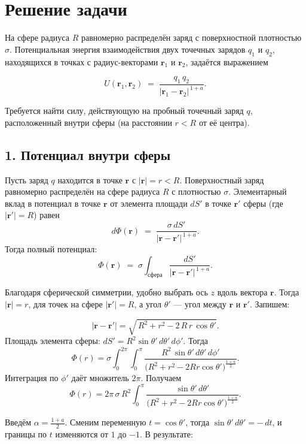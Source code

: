 \documentclass{article}
\begin{document}
\section*{Решение задачи}

На сфере радиуса $R$ равномерно распределён заряд с поверхностной плотностью $\sigma$. Потенциальная энергия взаимодействия двух точечных зарядов $q_1$ и $q_2$, находящихся в точках с радиус-векторами $\mathbf{r}_1$ и $\mathbf{r}_2$, задаётся выражением

\[
U(\mathbf{r}_1,\mathbf{r}_2) \;=\; \frac{q_1\,q_2}{|\mathbf{r}_1 - \mathbf{r}_2|^{\,1+a}}.
\]

Требуется найти силу, действующую на пробный точечный заряд $q$, расположенный внутри сферы (на расстоянии $r<R$ от её центра).

\subsection*{1. Потенциал внутри сферы}

Пусть заряд $q$ находится в точке $\mathbf{r}$ с $|\mathbf{r}|=r<R$. Поверхностный заряд равномерно распределён на сфере радиуса $R$ с плотностью $\sigma$. Элементарный вклад в потенциал в точке $\mathbf{r}$ от элемента площади $dS'$ в точке $\mathbf{r}'$ сферы (где $|\mathbf{r}'|=R$) равен
\[
d\Phi(\mathbf{r}) \;=\; \frac{\sigma\,dS'}{|\mathbf{r} - \mathbf{r}'|^{\,1+a}}.
\]
Тогда полный потенциал:
\[
\Phi(\mathbf{r}) \;=\; \sigma \int_{\text{сфера}} \frac{dS'}{|\mathbf{r} - \mathbf{r}'|^{\,1+a}}.
\]

Благодаря сферической симметрии, удобно выбрать ось $z$ вдоль вектора $\mathbf{r}$. Тогда $|\mathbf{r}|=r$, для точек на сфере $|\mathbf{r}'|=R$, а угол $\theta'$ — угол между $\mathbf{r}$ и $\mathbf{r}'$. Запишем:

\[
|\mathbf{r}-\mathbf{r}'|
= \sqrt{\,R^2 + r^2 - 2\,R\,r\,\cos\theta'}.
\]
Площадь элемента сферы: $dS' = R^2\sin\theta'\, d\theta'\, d\phi'$. Тогда
\[
\Phi(r)
= \sigma \int_0^{2\pi}\! \int_0^\pi
\frac{R^2\,\sin\theta'\,d\theta'\,d\phi'}{\bigl(R^2 + r^2 - 2Rr\cos\theta'\bigr)^{\frac{1+a}{2}}}.
\]
Интеграция по $\phi'$ даёт множитель $2\pi$. Получаем
\[
\Phi(r)
= 2\pi\,\sigma\,R^2
\int_0^\pi
\frac{\sin\theta'\, d\theta'}{\bigl(R^2 + r^2 - 2Rr\cos\theta'\bigr)^{\frac{1+a}{2}}}.
\]

Введём $\alpha = \frac{1+a}{2}$. Сменим переменную $t = \cos\theta'$, тогда $\sin\theta'\, d\theta' = -\,dt$, и границы по $t$ изменяются от $1$ до $-1$. В результате:
\end{document}
